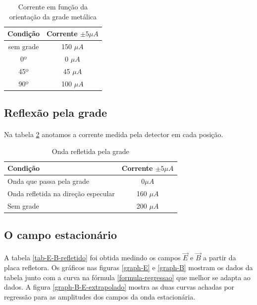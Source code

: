 \documentclass[a4paper,11pt]{article}
\begin{document}
	\begin{table}[!htp]
		\centering	
		\begin{tabular}{|c|c|}\hline
		Condição & Corrente $\pm 5 \mu A$  \\ \hline 
		sem grade & 150 $\mu A$ \\ \hline
		0º  & 0 $\mu A$\\ \hline
		45º & 45 $\mu A$\\ \hline	
		90º & 100 $\mu A$\\ \hline			
		\end{tabular}
		\caption{Corrente em função da orientação da grade metálica}
		\label{E-grad-tab}
	\end{table}

\subsection{Reflexão pela grade}

\paragraph{}Na tabela \ref{E-grad-refletida} anotamos a corrente medida pela detector em cada posição. 

	\begin{table}[!htp]
		\centering	
		\begin{tabular}{|l|c|}\hline
		Condição		 				& Corrente $\pm 5 \mu A$  \\ \hline 
		Onda que passa pela grade	 & 0$\mu A$ \\ \hline		
		Onda refletida na direção especular  & 160 $\mu A$ \\ \hline
		Sem grade   		& 200 $\mu A$\\ \hline
		
		\end{tabular}
		\caption{Onda refletida pela grade}
		\label{E-grad-refletida}	
	\end{table}
	

\subsection{O campo estacionário}
\paragraph{} A tabela \ref{tab-E-B-refletido} foi obtida medindo os campos $\vec{E}$ e $\vec{B}$ a partir da placa refletora. Os gráficos nas figuras \ref{graph-E} e \ref{graph-B} mostram os dados da tabela junto com a curva na fórmula \ref{formula-regressao} que melhor se adapta ao dados. A figura \ref{graph-B-E-extrapolado} mostra as duas curvas achadas por regressão para as amplitudes dos campos da onda estacionária. 
\end{document}
